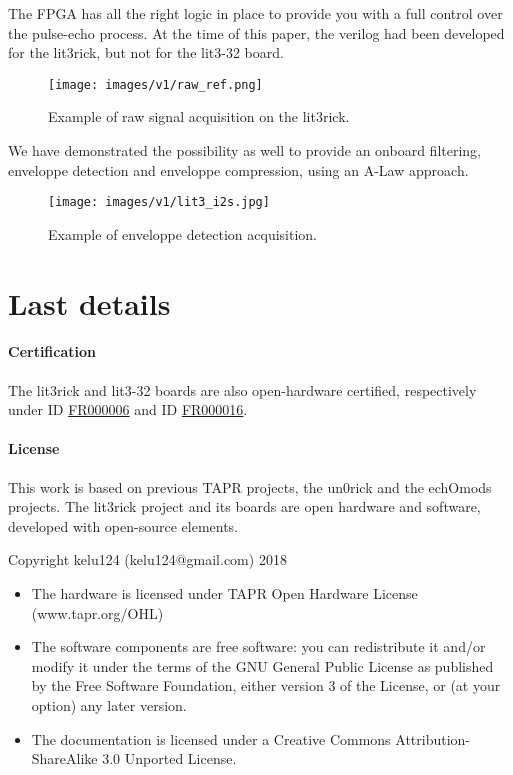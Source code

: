\documentclass{article}
\begin{document}
The FPGA has all the right logic in place to provide you with a full control over the pulse-echo process. At the time of this paper, the verilog had been developed for the lit3rick, but not for the lit3-32 board.

\begin{figure}[htp!]
  \centering
  \texttt{[image: images/v1/raw\_ref.png]}\hfill 
  \caption{Example of raw signal acquisition on the lit3rick.} 
  \label{fig:lit3rick}
  \end{figure}

We have demonstrated the possibility as well to provide an onboard filtering, enveloppe detection and enveloppe compression, using an A-Law approach. 


\begin{figure}[htp!]
  \centering
  \texttt{[image: images/v1/lit3\_i2s.jpg]}\hfill 
  \caption{Example of enveloppe detection acquisition.} 
  \label{fig:i2s}
  \end{figure}


 
\newpage \section{Last details}
\paragraph{Certification}

The lit3rick and lit3-32 boards are also open-hardware certified, respectively under ID \href{https://certification.oshwa.org/fr000006.html}{FR000006} and ID \href{https://certification.oshwa.org/fr000016.html}{FR000016}.


\paragraph{License}

This work is based on previous TAPR projects, the un0rick and the echOmods projects. The lit3rick project and its boards are open hardware and software, developed with open-source elements.

Copyright kelu124 (kelu124@gmail.com) 2018

\begin{itemize}
\item The hardware is licensed under TAPR Open Hardware License (www.tapr.org/OHL)
\item The software components are free software: you can redistribute it and/or modify it under the terms of the GNU General Public License as published by the Free Software Foundation, either version 3 of the License, or (at your option) any later version.
\item The documentation is licensed under a Creative Commons Attribution-ShareAlike 3.0 Unported License.
\end{itemize}
\end{document}

